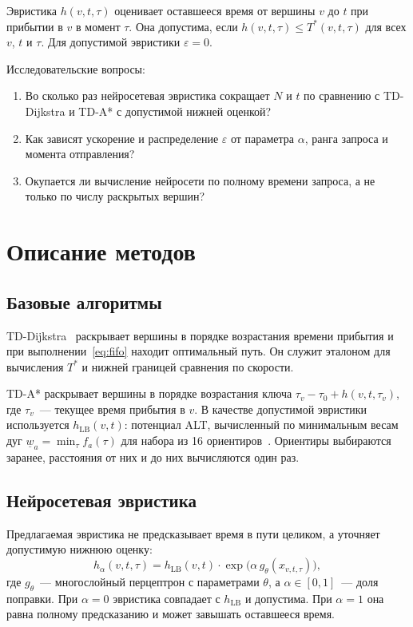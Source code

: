 \documentclass{misisarticle}
\begin{document}
Эвристика $h(v, t, \tau)$ оценивает оставшееся время от вершины $v$ до $t$ при прибытии в $v$ в момент $\tau$. Она допустима, если $h(v, t, \tau) \le T^*(v, t, \tau)$ для всех $v$, $t$ и $\tau$. Для допустимой эвристики $\varepsilon = 0$.

Исследовательские вопросы:
\begin{enumerate}
  \item Во сколько раз нейросетевая эвристика сокращает $N$ и $t$ по сравнению с TD-Dijkstra и TD-A* с допустимой нижней оценкой?
  \item Как зависят ускорение и распределение $\varepsilon$ от параметра $\alpha$, ранга запроса и момента отправления?
  \item Окупается ли вычисление нейросети по полному времени запроса, а не только по числу раскрытых вершин?
\end{enumerate}

\section{Описание методов}

\subsection{Базовые алгоритмы}

TD-Dijkstra~\cite{kaufman1993} раскрывает вершины в порядке возрастания времени прибытия и при выполнении~\eqref{eq:fifo} находит оптимальный путь. Он служит эталоном для вычисления $T^*$ и нижней границей сравнения по скорости.

TD-A* раскрывает вершины в порядке возрастания ключа $\tau_v - \tau_0 + h(v, t, \tau_v)$, где $\tau_v$~--- текущее время прибытия в $v$. В качестве допустимой эвристики используется $h_{\mathrm{LB}}(v, t)$: потенциал ALT, вычисленный по минимальным весам дуг $\underline{w}_a = \min_\tau f_a(\tau)$ для набора из 16 ориентиров~\cite{delling2007}. Ориентиры выбираются заранее, расстояния от них и до них вычисляются один раз.

\subsection{Нейросетевая эвристика}

Предлагаемая эвристика не предсказывает время в пути целиком, а уточняет допустимую нижнюю оценку:
\begin{equation}
  h_\alpha(v, t, \tau) = h_{\mathrm{LB}}(v, t) \cdot \exp\bigl(\alpha \, g_\theta(x_{v,t,\tau})\bigr),
  \label{eq:heuristic}
\end{equation}
где $g_\theta$~--- многослойный перцептрон с параметрами $\theta$, а $\alpha \in [0, 1]$~--- доля поправки. При $\alpha = 0$ эвристика совпадает с $h_{\mathrm{LB}}$ и допустима. При $\alpha = 1$ она равна полному предсказанию и может завышать оставшееся время.
\end{document}
